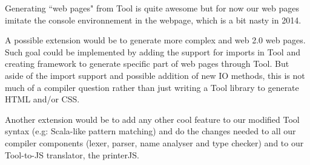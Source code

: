 Generating ``web pages" from Tool is quite awesome but for now our web pages imitate the
console environnement in the webpage, which is a bit nasty in 2014.

A possible extension would be to generate more complex and web 2.0
web pages. Such goal could be implemented by adding the support for imports in Tool and creating framework to generate specific part of web pages through Tool. But aside of the import support and possible addition of new IO methods, this is not much of a compiler question rather than just writing a Tool library to generate HTML and/or CSS.

Another extension would be to add any other cool feature to our modified Tool syntax (e.g: Scala-like pattern matching) and do the changes needed to all our compiler components (lexer, parser, name analyser and type checker) and to our Tool-to-JS translator, the printerJS.